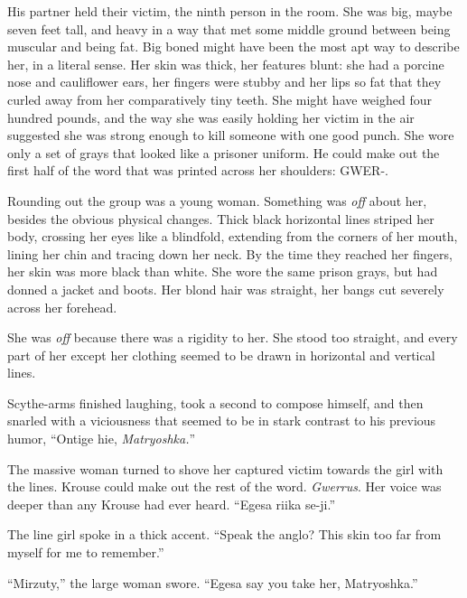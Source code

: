 His partner held their victim, the ninth person in the room.  She was big, maybe seven feet tall, and heavy in a way that met some middle ground between being muscular and being fat.  Big boned might have been the most apt way to describe her, in a literal sense.  Her skin was thick, her features blunt: she had a porcine nose and cauliflower ears, her fingers were stubby and her lips so fat that they curled away from her comparatively tiny teeth.  She might have weighed four hundred pounds, and the way she was easily holding her victim in the air suggested she was strong enough to kill someone with one good punch.  She wore only a set of grays that looked like a prisoner uniform.  He could make out the first half of the word that was printed across her shoulders: GWER-.



Rounding out the group was a young woman.  Something was \emph{off} about her, besides the obvious physical changes.  Thick black horizontal lines striped her body, crossing her eyes like a blindfold, extending from the corners of her mouth, lining her chin and tracing down her neck.  By the time they reached her fingers, her skin was more black than white.  She wore the same prison grays, but had donned a jacket and boots.  Her blond hair was straight, her bangs cut severely across her forehead.



She was \emph{off} because there was a rigidity to her.  She stood too straight, and every part of her except her clothing seemed to be drawn in horizontal and vertical lines.



Scythe-arms finished laughing, took a second to compose himself, and then snarled with a viciousness that seemed to be in stark contrast to his previous humor,  ``Ontige hie, \emph{Matryoshka.}''



The massive woman turned to shove her captured victim towards the girl with the lines.  Krouse could make out the rest of the word.  \emph{Gwerrus}.  Her voice was deeper than any Krouse had ever heard. ``Egesa riika se-ji.''



The line girl spoke in a thick accent.  ``Speak the anglo?  This skin too far from myself for me to remember.''



``Mirzuty,'' the large woman swore.  ``Egesa say you take her, Matryoshka.''



